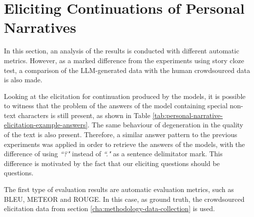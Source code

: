 \section{Eliciting Continuations of Personal Narratives}
\label{cha:methodology-personal-narrative-elicitation-results}
In this section, an analysis of the results is conducted with different automatic metrics. However, as a marked difference from the experiments using story cloze test, a comparison of the LLM-generated data with the human crowdsourced data is also made.


Looking at the elicitation for continuation produced by the models, it is possible to witness that the problem of the answers of the model containing special non-text characters is still present, as shown in Table \ref{tab:personal-narrative-elicitation-example-answers}. The same behaviour of degeneration in the quality of the text is also present. Therefore, a similar answer pattern to the previous experiments was applied in order to retrieve the answers of the models, with the difference of using \emph{``?"} instead of \emph{``."} as a sentence delimitator mark. This difference is motivated by the fact that our eliciting questions should be questions.
% 


% 
The first type of evaluation results are automatic evaluation metrics, such as BLEU, METEOR and ROUGE. In this case, as ground truth, the crowdsourced elicitation data from section \ref{cha:methodology-data-collection} is used.

